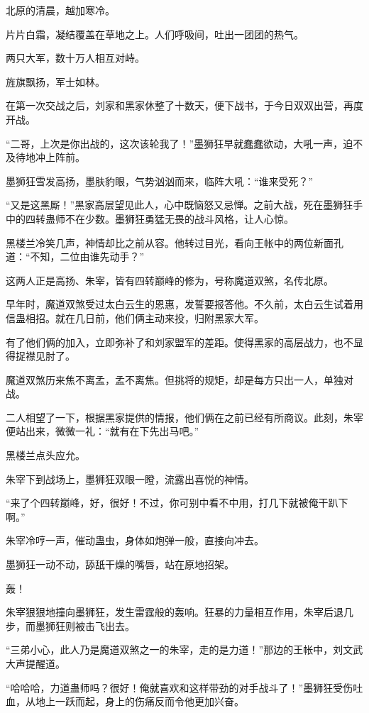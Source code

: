 
\begin{this_body}

北原的清晨，越加寒冷。

片片白霜，凝结覆盖在草地之上。人们呼吸间，吐出一团团的热气。

两只大军，数十万人相互对峙。

旌旗飘扬，军士如林。

在第一次交战之后，刘家和黑家休整了十数天，便下战书，于今日双双出营，再度开战。

“二哥，上次是你出战的，这次该轮我了！”墨狮狂早就蠢蠢欲动，大吼一声，迫不及待地冲上阵前。

墨狮狂雪发高扬，墨肤豹眼，气势汹汹而来，临阵大吼：“谁来受死？”

“又是这黑厮！”黑家高层望见此人，心中既恼怒又忌惮。之前大战，死在墨狮狂手中的四转蛊师不在少数。墨狮狂勇猛无畏的战斗风格，让人心惊。

黑楼兰冷笑几声，神情却比之前从容。他转过目光，看向王帐中的两位新面孔道：“不知，二位由谁先动手？”

这两人正是高扬、朱宰，皆有四转巅峰的修为，号称魔道双煞，名传北原。

早年时，魔道双煞受过太白云生的恩惠，发誓要报答他。不久前，太白云生试着用信蛊相招。就在几日前，他们俩主动来投，归附黑家大军。

有了他们俩的加入，立即弥补了和刘家盟军的差距。使得黑家的高层战力，也不显得捉襟见肘了。

魔道双煞历来焦不离孟，孟不离焦。但挑将的规矩，却是每方只出一人，单独对战。

二人相望了一下，根据黑家提供的情报，他们俩在之前已经有所商议。此刻，朱宰便站出来，微微一礼：“就有在下先出马吧。”

黑楼兰点头应允。

朱宰下到战场上，墨狮狂双眼一瞪，流露出喜悦的神情。

“来了个四转巅峰，好，很好！不过，你可别中看不中用，打几下就被俺干趴下啊。”

朱宰冷哼一声，催动蛊虫，身体如炮弹一般，直接向冲去。

墨狮狂一动不动，舔舐干燥的嘴唇，站在原地招架。

轰！

朱宰狠狠地撞向墨狮狂，发生雷霆般的轰响。狂暴的力量相互作用，朱宰后退几步，而墨狮狂则被击飞出去。

“三弟小心，此人乃是魔道双煞之一的朱宰，走的是力道！”那边的王帐中，刘文武大声提醒道。

“哈哈哈，力道蛊师吗？很好！俺就喜欢和这样带劲的对手战斗了！”墨狮狂受伤吐血，从地上一跃而起，身上的伤痛反而令他更加兴奋。


\end{this_body}
